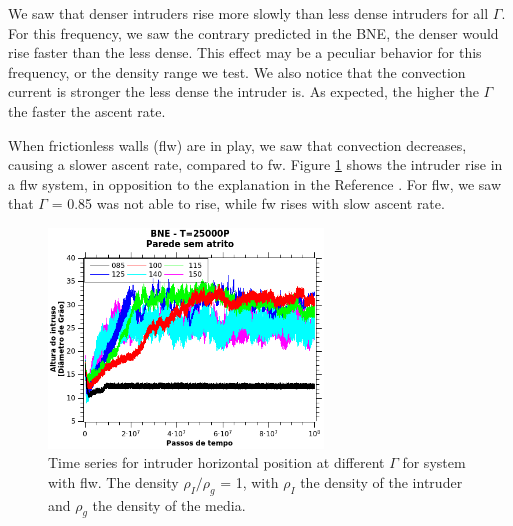     We saw that denser intruders rise more slowly than less dense intruders for all $\Gamma$. For this frequency, we saw the contrary predicted in the BNE, the denser would rise faster than the less dense. This effect may be a peculiar behavior for this frequency, or the density range we test. We also notice that the convection current is stronger the less dense the intruder is. As expected, the higher the $\Gamma$ the faster the ascent rate.


    When frictionless walls (flw) are in play, we saw that convection decreases, causing a slower ascent rate, compared to fw. Figure \ref{fig:BNE25000_sem_Atrito_Parede} shows the intruder rise in a flw system, in opposition to the explanation in the Reference \cite{Inertia_in_the_Brazil_nut_problem}. For flw, we saw that $\Gamma$ = 0.85 was not able to rise, while fw rises with slow ascent rate.

\begin{figure}
    \centering
    \includegraphics[width=0.65\textwidth]{04-figuras/BNE25000PsemAtrito.png}
    \caption[BNE with frictionless walls.]{Time series for intruder horizontal position at different $\Gamma$ for system with flw. The density $\rho_I/\rho_g$ = 1, with $\rho_I$ the density of the intruder and $\rho_g$ the density of the media.}
    \label{fig:BNE25000_sem_Atrito_Parede}
\end{figure}


